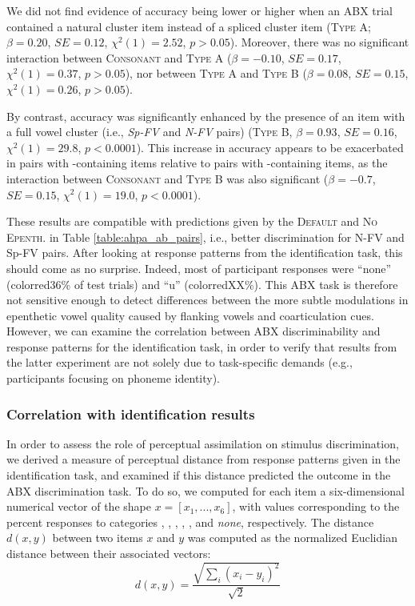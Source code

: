 {We did not find evidence of accuracy being lower or higher when an ABX trial contained a natural cluster item instead of a spliced cluster item (\textsc{Type A}; $\beta = 0.20$, $SE = 0.12$, $\chi^2(1) = 2.52$, $p > 0.05$). Moreover, there was no significant interaction between \textsc{Consonant} and \textsc{Type A} ($\beta = -0.10$, $SE = 0.17$, $\chi^2(1) = 0.37$, $p > 0.05$), nor between \textsc{Type A} and \textsc{Type B} ($\beta = 0.08$, $SE = 0.15$, $\chi^2(1) = 0.26$, $p > 0.05$).

By contrast, accuracy was significantly enhanced by the presence of an item with a full vowel cluster (i.e., \textit{Sp-FV} and \textit{N-FV} pairs) (\textsc{Type B}, $\beta = 0.93$, $SE = 0.16$, $\chi^2(1) = 29.8$, $p < 0.0001$). This increase in accuracy appears to be exacerbated in pairs with -containing items relative to pairs with -containing items, as the interaction between \textsc{Consonant} and \textsc{Type B} was also significant ($\beta = -0.7$, $SE = 0.15$, $\chi^2(1) = 19.0$, $p < 0.0001$).

These results are compatible with predictions given by the \textsc{Default} and \textsc{No Epenth.} in Table \ref{table:ahpa_ab_pairs}, i.e., better discrimination for N-FV and Sp-FV pairs. After looking at response patterns from the identification task, this should come as no surprise. Indeed, most of participant responses were ``none'' ({color{red}36\% of test trials}) and ``u'' ({color{red}XX\%}). This ABX task is therefore not sensitive enough to detect differences between the more subtle modulations in epenthetic vowel quality caused by flanking vowels and coarticulation cues. However, we can examine the correlation between ABX discriminability and response patterns for the identification task, in order to verify that results from the latter experiment are not solely due to task-specific demands (e.g., participants focusing on phoneme identity).    

\subsubsection{Correlation with identification results}

In order to assess the role of perceptual assimilation on stimulus discrimination, we derived a measure of perceptual distance from response patterns given in the identification task, and examined if this distance predicted the outcome in the ABX discrimination task. To do so, we computed for each item a six-dimensional numerical vector of the shape $x = [x_{1}, ..., x_{6}]$, with values corresponding to the percent responses to categories , , , , , and \textit{none}, respectively. The distance $d(x,y)$ between two items $x$ and $y$ was computed as the normalized Euclidian distance between their associated vectors:
    \[d(x,y)=\frac{\sqrt{\sum_i (x_{i} - y_{i})^{2}}} {\sqrt{2}}\]

}
